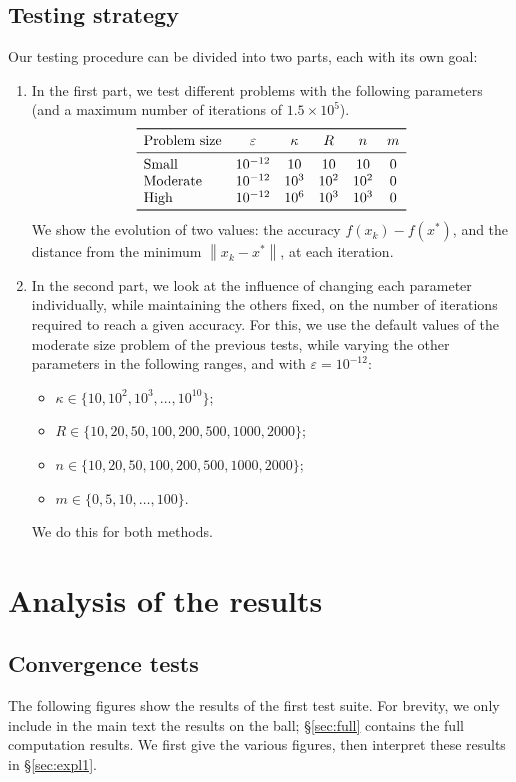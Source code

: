 \documentclass[final]{aomart}
\newtheorem[{}\it]{thm}{Theorem}[section]
\theoremstyle{definition}
\newtheorem*[{}\it]{notation}{Notation}
\numberwithin{equation}{section}
\newcommand{\secref}[1]{\S\ref{#1}}
\renewcommand{\epsilon}{\varepsilon}
\newcommand{\enVert}[1]{\left\lVert#1\right\rVert}
\let\norm=\enVert
\begin{document}
\subsection{Testing strategy}
Our testing procedure can be divided into two parts, each with its own goal:
\begin{enumerate}
	\item In the first part, we test different problems with the following parameters (and a maximum number of iterations of \(1.5 \times 10^5\)).
	\[
	\begin{array}{lccccc}
	\toprule
	\textnormal{Problem size} & \epsilon & \kappa & R & n & m\\
	\midrule
	\textnormal{Small} & 10^{-12} & 10 & 10 & 10 & 0\\
	\textnormal{Moderate} & 10^{-12} & 10^3 & 10^2 & 10^2 & 0\\
	\textnormal{High} & 10^{-12} & 10^6 & 10^3 & 10^3 & 0\\
	\bottomrule
	\end{array}
	\]
	We show the evolution of two values: the accuracy \(f(x_k) - f(x^*)\), and the distance from the minimum \(\norm{x_k - x^*}\), at each iteration.%
	\item In the second part, we look at the influence of changing each parameter individually, while maintaining the others fixed, on the number of iterations required to reach a given accuracy.
	For this, we use the default values of the moderate size problem of the previous tests, while varying the other parameters in the following ranges, and with \(\epsilon = 10^{-12}\):
	\begin{itemize}
		\item \(\kappa \in \{10, 10^2, 10^3, \dots, 10^{10}\}\);
		\item \(R \in \{10, 20, 50, 100, 200, 500, 1000, 2000\}\);
		\item \(n \in \{10, 20, 50, 100, 200, 500, 1000, 2000\}\);
		\item \(m \in \{0, 5, 10, \dots, 100\}\).
	\end{itemize}
	We do this for both methods.
\end{enumerate}

\section{Analysis of the results}
\label{sec:analysis}
\subsection{Convergence tests}
The following figures show the results of the first test suite.
For brevity, we only include in the main text the results on the ball; \secref{sec:full} contains the full computation results.
We first give the various figures, then interpret these results in \secref{sec:expl1}.
\end{document}
